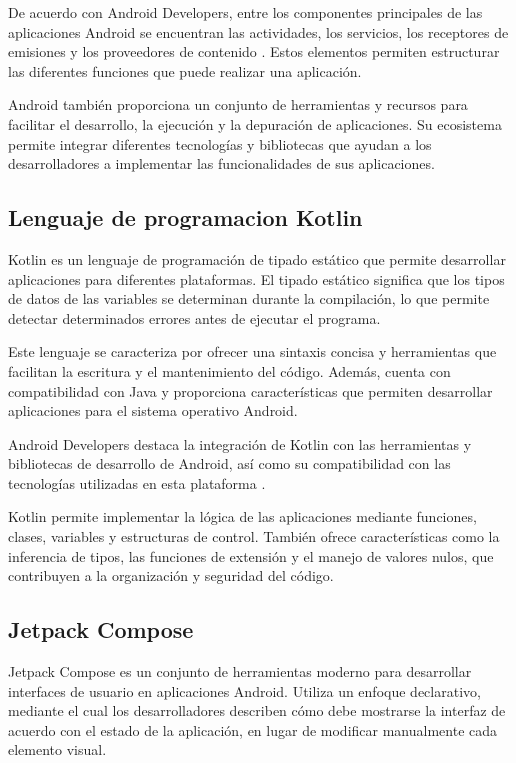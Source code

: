 \documentclass[12pt,a4paper]{article}
\begin{document}
De acuerdo con Android Developers, entre los componentes
principales de las aplicaciones Android se encuentran las
actividades, los servicios, los receptores de emisiones y
los proveedores de contenido \textcite{androidSistema}.
Estos elementos permiten estructurar las diferentes
funciones que puede realizar una aplicación.

Android también proporciona un conjunto de herramientas
y recursos para facilitar el desarrollo, la ejecución y
la depuración de aplicaciones. Su ecosistema permite
integrar diferentes tecnologías y bibliotecas que ayudan
a los desarrolladores a implementar las funcionalidades
de sus aplicaciones.


\subsection{Lenguaje de programacion Kotlin}
Kotlin es un lenguaje de programación de tipado estático
que permite desarrollar aplicaciones para diferentes
plataformas. El tipado estático significa que los tipos
de datos de las variables se determinan durante la
compilación, lo que permite detectar determinados
errores antes de ejecutar el programa.

Este lenguaje se caracteriza por ofrecer una sintaxis
concisa y herramientas que facilitan la escritura y el
mantenimiento del código. Además, cuenta con
compatibilidad con Java y proporciona características
que permiten desarrollar aplicaciones para el sistema
operativo Android.

Android Developers destaca la integración de Kotlin
con las herramientas y bibliotecas de desarrollo de
Android, así como su compatibilidad con las tecnologías
utilizadas en esta plataforma
\textcite{androidKotlinDocs}.

Kotlin permite implementar la lógica de las aplicaciones
mediante funciones, clases, variables y estructuras de
control. También ofrece características como la
inferencia de tipos, las funciones de extensión y el
manejo de valores nulos, que contribuyen a la
organización y seguridad del código.

\subsection{Jetpack Compose}
Jetpack Compose es un conjunto de herramientas moderno
para desarrollar interfaces de usuario en aplicaciones
Android. Utiliza un enfoque declarativo, mediante el cual
los desarrolladores describen cómo debe mostrarse la
interfaz de acuerdo con el estado de la aplicación, en
lugar de modificar manualmente cada elemento visual.
\end{document}
